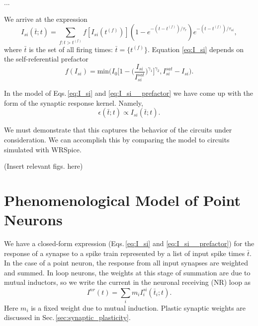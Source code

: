 \documentclass[]{article}
\begin{document}
...


We arrive at the expression
\begin{equation}
\label{eq:I_si}
I_{si}(\bar{t};t) = \sum_{f: t>t^{(f)}} f[I_{si}(t^{(f)})](1-e^{-(t-t^{(f)})/\tau_r})e^{-(t-t^{(f)})/\tau_{si}},
\end{equation}
where $\bar{t}$ is the set of all firing times: $\bar{t} = \{t^{(f)}\}$. Equation \ref{eq:I_si} depends on the self-referential prefactor
\begin{equation}
\label{eq:I_si__prefactor}
f(I_{si}) = \mathrm{min}\bigg(I_0\bigg[1-\bigg(\frac{I_{si}}{I_{si}^{sat}}\bigg)^{\gamma_1}\bigg]^{\gamma_2},I_{si}^{sat}-I_{si}\bigg).
\end{equation}

In the model of Eqs.\,\ref{eq:I_si} and \ref{eq:I_si__prefactor} we have come up with the form of the synaptic response kernel. Namely, 
\begin{equation}
\label{eq:I_si__synaptic_response_kernel}
\epsilon(\bar{t};t) \propto I_{si}(\bar{t};t).
\end{equation}

We must demonstrate that this captures the behavior of the circuits under consideration. We can accomplish this by comparing the model to circuits simulated with WRSpice.

(Insert relevant figs. here)

\section{\label{sec:neurons}Phenomenological Model of Point Neurons}
We have a closed-form expression (Eqs.\,\ref{eq:I_si} and \ref{eq:I_si__prefactor}) for the response of a synapse to a spike train represented by a list of input spike times $\bar{t}$. In the case of a point neuron, the response from all input synapses are weighted and summed. In loop neurons, the weights at this stage of summation are due to mutual inductors, so we write the current in the neuronal receiving (NR) loop as
\begin{equation}
\label{eq:I_nr}
I^{nr}(t) = \sum_i m_i I_i^{si}(\bar{t}_i;t).
\end{equation}
Here $m_i$ is a fixed weight due to mutual induction. Plastic synaptic weights are discussed in Sec.\,\ref{sec:synaptic_plasticity}. 
\end{document}

